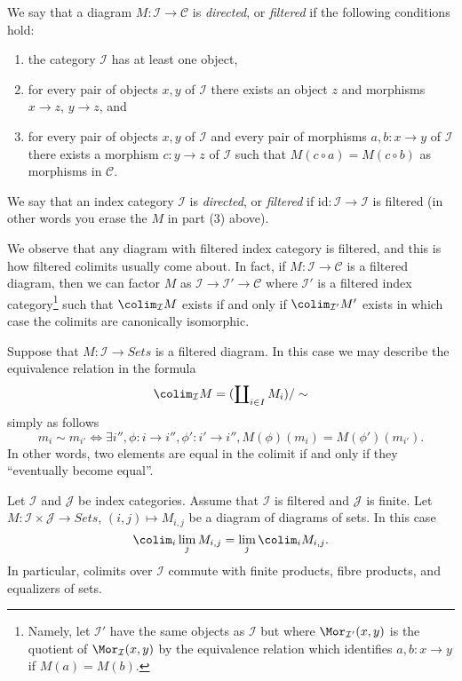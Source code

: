 \begin{definition}
\label{definition-directed}
We say that a diagram $M : \mathcal{I} \to \mathcal{C}$ is {\it directed},
or {\it filtered} if the following conditions hold:
\begin{enumerate}
\item the category $\mathcal{I}$ has at least one object,
\item for every pair of objects $x, y$ of $\mathcal{I}$
there exists an object $z$ and morphisms $x \to z$,
$y \to z$, and
\item for every pair of objects $x, y$ of $\mathcal{I}$
and every pair of morphisms $a, b : x \to y$ of $\mathcal{I}$
there exists a morphism $c : y \to z$ of $\mathcal{I}$
such that $M(c \circ a) = M(c \circ b)$ as morphisms in $\mathcal{C}$.
\end{enumerate}
We say that an index category $\mathcal{I}$ is {\it directed}, or
{\it filtered} if $\text{id} : \mathcal{I} \to \mathcal{I}$ is filtered
(in other words you erase the $M$ in part (3) above).
\end{definition}

\noindent
We observe that any diagram with filtered index category is filtered,
and this is how filtered colimits usually come about. In fact, if
$M : \mathcal{I} \to \mathcal{C}$ is a filtered diagram, then we
can factor $M$ as $\mathcal{I} \to \mathcal{I}' \to \mathcal{C}$
where $\mathcal{I}'$ is a filtered index category\footnote{Namely, let
$\mathcal{I}'$ have the same objects as $\mathcal{I}$ but
where $\Mor_{\mathcal{I}'}(x, y)$ is the quotient of $\Mor_\mathcal{I}(x, y)$
by the equivalence relation which identifies
$a, b : x \to y$ if $M(a) = M(b)$.}
such that $\colim_\mathcal{I} M$ exists if and only if
$\colim_{\mathcal{I}'} M'$ exists in which case the colimits are
canonically isomorphic.

\medskip\noindent
Suppose that $M : \mathcal{I} \to \textit{Sets}$ is a filtered diagram. In
this case we may describe the equivalence relation in the formula
$$
\colim_\mathcal{I} M
=
(\coprod\nolimits_{i\in I} M_i)/\sim
$$
simply as follows
$$
m_i \sim m_{i'}
\Leftrightarrow
\exists i'', \phi : i \to i'', \phi': i' \to i'',
M(\phi)(m_i) = M(\phi')(m_{i'}).
$$
In other words, two elements are equal in the colimit if and only if
they ``eventually become equal''.

\begin{lemma}
\label{lemma-directed-commutes}
Let $\mathcal{I}$ and $\mathcal{J}$ be index categories.
Assume that $\mathcal{I}$ is filtered and $\mathcal{J}$ is finite.
Let $M : \mathcal{I} \times \mathcal{J} \to \textit{Sets}$,
$(i, j) \mapsto M_{i, j}$ be a diagram of diagrams of sets.
In this case
$$
\colim_i \lim_j M_{i, j}
=
\lim_j \colim_i M_{i, j}.
$$
In particular, colimits over $\mathcal{I}$ commute with finite products,
fibre products, and equalizers of sets.
\end{lemma}

